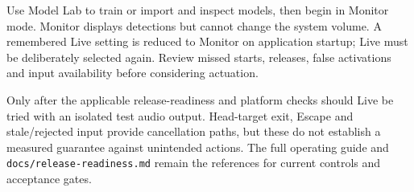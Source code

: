 Use Model Lab to train or import and inspect models, then begin in Monitor mode. Monitor displays detections but cannot change the system volume. A remembered Live setting is reduced to Monitor on application startup; Live must be deliberately selected again. Review missed starts, releases, false activations and input availability before considering actuation.

Only after the applicable release-readiness and platform checks should Live be tried with an isolated test audio output. Head-target exit, Escape and stale/rejected input provide cancellation paths, but these do not establish a measured guarantee against unintended actions. The full operating guide and \nolinkurl{docs/release-readiness.md} remain the references for current controls and acceptance gates.
